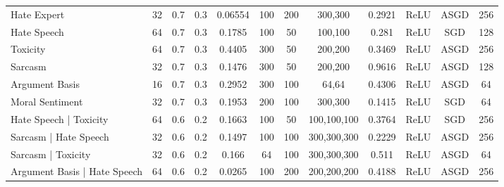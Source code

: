 {\begin{landscape}
\begin{table}[]
{\begin{tabular}{l|ccccccccccc}
      Hate Expert                                       & 32         & 0.7              & 0.3              & 0.06554 & 100           & 200    & 300,300         & 0.2921        & ReLU          & ASGD      & 256        \\
      Hate Speech                                       & 64         & 0.7              & 0.3              & 0.1785  & 100           & 50     & 100,100         & 0.281         & ReLU          & SGD       & 128        \\
      Toxicity                                          & 64         & 0.7              & 0.3              & 0.4405  & 300           & 50     & 200,200         & 0.3469        & ReLU          & ASGD      & 256        \\
      Sarcasm                                           & 32         & 0.7              & 0.3              & 0.1476  & 300           & 50     & 200,200         & 0.9616        & ReLU          & ASGD      & 128        \\
      Argument Basis                                    & 16         & 0.7              & 0.3              & 0.2952  & 300           & 100    & 64,64           & 0.4306        & ReLU          & ASGD      & 64         \\
      Moral Sentiment                                   & 32         & 0.7              & 0.3              & 0.1953  & 200           & 100    & 300,300         & 0.1415        & ReLU          & SGD       & 64         \\ \hline
      Hate Speech | Toxicity                            & 64         & 0.6              & 0.2              & 0.1663  & 100           & 50     & 100,100,100     & 0.3764        & ReLU          & SGD       & 256        \\
      Sarcasm | Hate Speech                             & 32         & 0.6              & 0.2              & 0.1497  & 100           & 100    & 300,300,300     & 0.2229        & ReLU          & ASGD      & 256        \\
      Sarcasm | Toxicity                                & 32         & 0.6              & 0.2              & 0.166   & 64            & 100    & 300,300,300     & 0.511         & ReLU          & ASGD      & 64         \\
      Argument Basis | Hate Speech                      & 64         & 0.6              & 0.2              & 0.0265  & 100           & 200    & 200,200,200     & 0.4188        & ReLU          & ASGD      & 256        \\

\end{tabular}}
\end{table}
\end{landscape}}
